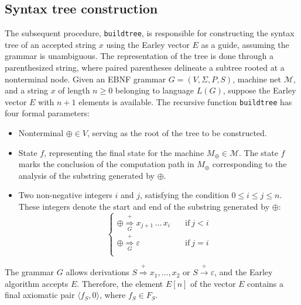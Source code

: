 \subsection{Syntax tree construction}
The subsequent procedure, \texttt{buildtree}, is responsible for constructing the syntax tree of an accepted string $x$ using the Earley vector $E$ as a guide, assuming the grammar is unambiguous.
The representation of the tree is done through a parenthesized string, where paired parentheses delineate a subtree rooted at a nonterminal node.
Given an EBNF grammar $G = \left( V, \Sigma, P, S \right)$, machine net $\mathcal{M}$, and a string $x$ of length $n \geq 0$ belonging to language $L(G)$, suppose the Earley vector $E$ with $n+1$ elements is available.
The recursive function \texttt{buildtree} has four formal parameters:
\begin{itemize}
    \item Nonterminal $\oplus \in V$, serving as the root of the tree to be constructed.
    \item State $f$, representing the final state for the machine $M_\oplus \in \mathcal{M}$. 
        The state $f$ marks the conclusion of the computation path in $M_\oplus$ corresponding to the analysis of the substring generated by $\oplus$.
    \item Two non-negative integers $i$ and $j$, satisfying the condition $0 \leq i \leq j \leq n$. 
        These integers denote the start and end of the substring generated by $\oplus$:
        \[\begin{cases}
            \oplus \overset{+}{\underset{G}{\Rightarrow}} x_{j+1} \,\ldots\, x_i \quad & \text{if} \ j < i \\[1.5ex]
            \oplus \overset{+}{\underset{G}{\Rightarrow}} \varepsilon \quad            & \text{if} \ j = i \\
        \end{cases}\]
\end{itemize}
The grammar $G$ allows derivations $S \overset{+}{\Rightarrow} x_1, \dots, x_2$ or $S \overset{+}{\rightarrow} \varepsilon$, and the Earley algorithm accepts $E$. 
Therefore, the element $E[n]$ of the vector $E$ contains a final axiomatic pair $\langle f_S, 0 \rangle$, where $f_S \in F_S$.

